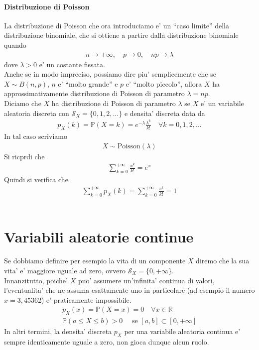 \documentclass[a4paper,12pt]{article}
\begin{document}
\paragraph{Distribuzione di Poisson} La distribuzione di Poisson che ora introduciamo e' un “caso limite” della distribuzione binomiale, che si ottiene a partire dalla distribuzione binomiale quando
\begin{align*}
  n \to + \infty, \quad p \to 0, \quad np \to \lambda
\end{align*}
dove $\lambda > 0$ e' un costante fissata.\\
Anche se in modo impreciso, possiamo dire piu' semplicemente che se $X \sim B(n, p)$, $n$ e' “molto grande” e $p$ e' “molto piccolo”, allora $X$ ha approssimativamente distribuzione di Poisson di parametro $\lambda = np$.\\
Diciamo che $X$ ha distribuzione di Poisson di parametro $\lambda$ se $X$ e' un variabile aleatoria discreta con $\mathcal{S}_X = \{0,1,2,\dots\}$ e densita' discreta data da
\begin{align*}
  p_X(k) = \mathbb{P}(X=k) = e^{-\lambda}\frac{\lambda^k}{k!} \quad \forall k = 0,1,2,\dots
\end{align*}
In tal caso scriviamo 
\begin{align*}
  X \sim \text{Poisson}(\lambda)
\end{align*}
Si ricprdi che 
\begin{align*}
  \sum_{k=0}^{+\infty}\frac{x^k}{k!}=e^x
\end{align*}
Quindi si verifica che
\begin{align*}
  \sum_{k=0}^{+\infty} p_X(k) = \sum_{k=0}^{+\infty}\frac{x^k}{k!} = 1
\end{align*}
\vspace{5px}\\
\section{Variabili aleatorie continue}
Se dobbiamo definire per esempio la vita di un componente $X$ diremo che la sua vita' e' maggiore uguale ad zero, ovvero $\mathcal{S}_X = \{0, + \infty\}$.\\
Innanzitutto, poiche' $X$ puo' assumere un’infinita' continua di valori, l’eventualita' che ne assuma esattamente uno in particolare (ad esempio il numero $x = 3,45362$) e' praticamente impossibile.
\begin{align*}
  p_X(x) = \mathbb{P}(X=x)=0 \quad \forall x \in \mathbb{R} \\
  \mathbb{P}(a \leq X \leq b) > 0 \quad \text{ se } [a,b] \subset [0, +\infty]
\end{align*}
In altri termini, la densita' discreta $p_X$ per una variabile aleatoria continua e' sempre identicamente uguale a zero, non gioca dunque alcun ruolo.
\end{document}
